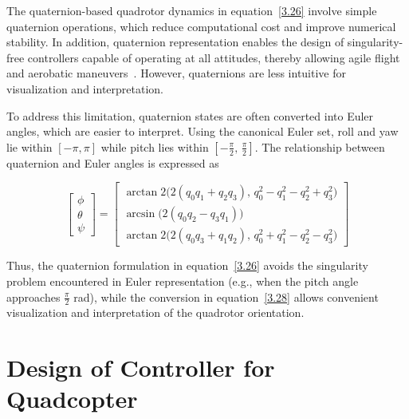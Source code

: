 \begin{small}
The quaternion-based quadrotor dynamics in equation~\eqref{3.26} involve simple quaternion 
operations, which reduce computational cost and improve numerical stability. In addition, 
quaternion representation enables the design of singularity-free controllers capable of 
operating at all attitudes, thereby allowing agile flight and aerobatic maneuvers~\cite{nekoo2022quaternion}. 
However, quaternions are less intuitive for visualization and interpretation.

To address this limitation, quaternion states are often converted into Euler angles, which 
are easier to interpret. Using the canonical Euler set, roll and yaw lie within $[-\pi,\pi]$ 
while pitch lies within $\left[-\tfrac{\pi}{2},\,\tfrac{\pi}{2}\right]$. The relationship 
between quaternion and Euler angles is expressed as~\cite{schreier2013quaternion}

\begin{equation}
\begin{bmatrix}
\phi \\[4pt]
\theta \\[4pt]
\psi
\end{bmatrix}
=
\begin{bmatrix}
\arctan 2\big(2(q_0q_1+q_2q_3),\, q_0^2 - q_1^2 - q_2^2 + q_3^2\big) \\[6pt]
\arcsin\big(2(q_0q_2 - q_3q_1)\big) \\[6pt]
\arctan 2\big(2(q_0q_3+q_1q_2),\, q_0^2+q_1^2-q_2^2-q_3^2\big)
\end{bmatrix}
\label{3.28}
\end{equation}

Thus, the quaternion formulation in equation~\eqref{3.26} avoids the singularity problem 
encountered in Euler representation (e.g., when the pitch angle approaches 
$\tfrac{\pi}{2}$ rad), while the conversion in equation~\eqref{3.28} allows convenient 
visualization and interpretation of the quadrotor orientation.







\section{Design of Controller for Quadcopter}


\end{small}
